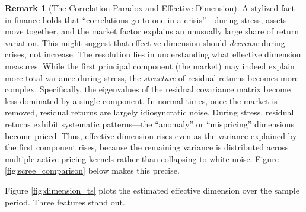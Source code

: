 \documentclass[12pt,letterpaper]{article}
\theoremstyle{plain}
\theoremstyle{definition}
\newtheorem{remark}{Remark}
\begin{document}
\begin{remark}[The Correlation Paradox and Effective Dimension]\label{rem:correlation_paradox}
A stylized fact in finance holds that ``correlations go to one in a crisis''---during stress, assets move together, and the market factor explains an unusually large share of return variation. This might suggest that effective dimension should \textit{decrease} during crises, not increase. The resolution lies in understanding what effective dimension measures. While the first principal component (the market) may indeed explain more total variance during stress, the \textit{structure} of residual returns becomes more complex. Specifically, the eigenvalues of the residual covariance matrix become less dominated by a single component. In normal times, once the market is removed, residual returns are largely idiosyncratic noise. During stress, residual returns exhibit systematic patterns---the ``anomaly'' or ``mispricing'' dimensions become priced. Thus, effective dimension rises even as the variance explained by the first component rises, because the remaining variance is distributed across multiple active pricing kernels rather than collapsing to white noise. Figure \ref{fig:scree_comparison} below makes this precise.
\end{remark}

Figure \ref{fig:dimension_ts} plots the estimated effective dimension over the sample period. Three features stand out.
\end{document}
